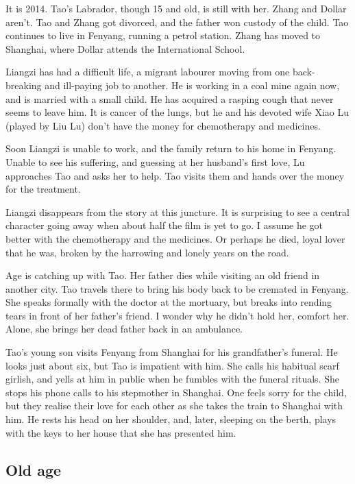 \documentclass{article}
\begin{document}
It is 2014.  Tao's Labrador, though 15 and old, is still with her.
Zhang and Dollar aren't.  Tao and Zhang got divorced, and the father
won custody of the child.  Tao continues to live in Fenyang, running a
petrol station.  Zhang has moved to Shanghai, where Dollar attends the
International School.

Liangzi has had a difficult life, a migrant labourer moving from one
back-breaking and ill-paying job to another.  He is working in a coal
mine again now, and is married with a small child.  He has acquired a
rasping cough that never seems to leave him.  It is cancer of the
lungs, but he and his devoted wife Xiao Lu (played by Liu Lu) don't
have the money for chemotherapy and medicines.

Soon Liangzi is unable to work, and the family return to his home in
Fenyang.  Unable to see his suffering, and guessing at her husband's
first love, Lu approaches Tao and asks her to help.  Tao visits them
and hands over the money for the treatment.

Liangzi disappears from the story at this juncture.  It is surprising
to see a central character going away when about half the film is yet
to go.  I assume he got better with the chemotherapy and the
medicines.  Or perhaps he died, loyal lover that he was, broken by the
harrowing and lonely years on the road.

Age is catching up with Tao.  Her father dies while visiting an old
friend in another city.  Tao travels there to bring his body back to
be cremated in Fenyang.  She speaks formally with the doctor at the
mortuary, but breaks into rending tears in front of her father's
friend.  I wonder why he didn't hold her, comfort her.  Alone, she
brings her dead father back in an ambulance.

Tao's young son visits Fenyang from Shanghai for his grandfather's
funeral.  He looks just about six, but Tao is impatient with him.  She
calls his habitual scarf girlish, and yells at him in public when he
fumbles with the funeral rituals.  She stops his phone calls to his
stepmother in Shanghai.  One feels sorry for the child, but they
realise their love for each other as she takes the train to Shanghai
with him.  He rests his head on her shoulder, and, later, sleeping on
the berth, plays with the keys to her house that she has presented
him.

\subsection{Old age}
\label{sec:7wgsj9bn}
\end{document}
